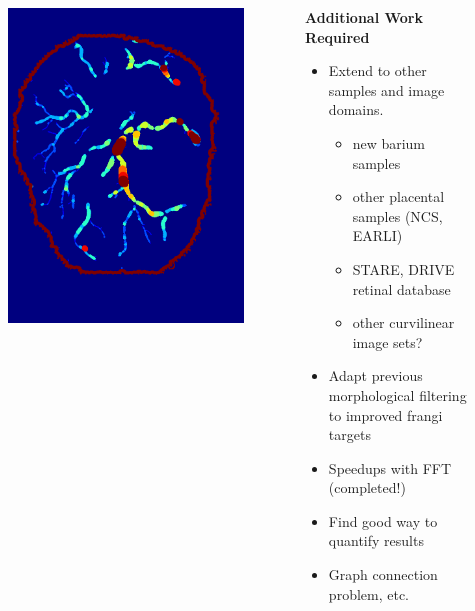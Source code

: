 \documentclass[9pt]{beamer}
\begin{document}
\begin{frame}
\begin{columns}[c]
\begin{column}{0.5\textwidth}
\begin{figure}
\includegraphics[height=0.45\textheight]{nb_on_skel_labeled}
\end{figure}
\end{column}
\begin{column}{0.4\textwidth}
\textbf{Additional Work Required}
\begin{itemize}
\item Extend to other samples and image domains.
\begin{itemize}
	\item new barium samples
	\item other placental samples (NCS, EARLI)
	\item STARE, DRIVE retinal database
	\item other curvilinear image sets?
	
\end{itemize}
\item Adapt previous morphological filtering to improved frangi targets
\item Speedups with FFT (completed!)
\item Find good way to quantify results
\item Graph connection problem, etc.

\end{itemize}

\end{column}
\end{columns}
\end{frame}
\end{document}
